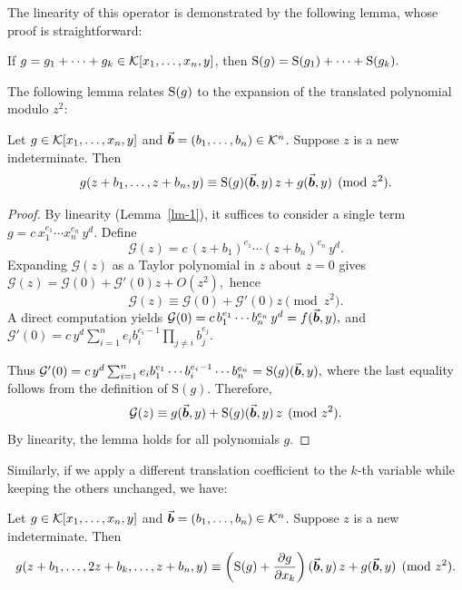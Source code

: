 \documentclass{article}
\numberwithin{equation}{section}
\begin{document}
The linearity of this operator is demonstrated by the following lemma, whose proof is straightforward:

\begin{lemma}\label{lm-1}
If $g = g_1 + \cdots + g_k\in {\mathcal{K}}[x_1,\dots,x_n,y]$, then
\(
{\rm S}(g) = {\rm S}(g_1) + \cdots + {\rm S}(g_k).
\)
\end{lemma}

The following lemma relates ${\rm S}(g)$ to the expansion of the translated polynomial modulo $z^2$:

\begin{lemma}\label{lm-4}
Let $g\in {\mathcal{K}}[x_1,\dots,x_n,y]$ and $\vec{\boldsymbol{b}}=(b_1,\dots,b_n)\in {\mathcal{K}}^{n}$. Suppose $z$ is a new indeterminate. Then
\[
g(z+b_1,\dots,z+b_n,y) \equiv \mathrm{S}(g)(\vec{\boldsymbol{b}},y)\, z + g(\vec{\boldsymbol{b}},y) \pmod{z^2}.\]
\end{lemma}
%
\begin{proof}
By linearity (Lemma~\ref{lm-1}), it suffices to consider a single term $g=c\,x_1^{e_1}\cdots x_n^{e_n}\,y^d$. Define
\[
\mathcal{G}(z)=c\,(z+b_1)^{e_1}\cdots (z+b_n)^{e_n}\,y^d.
\]
Expanding $\mathcal{G}(z)$ as a Taylor polynomial in $z$ about $z=0$ gives
%
$\mathcal{G}(z)=\mathcal{G}(0)+\mathcal{G}'(0)z+O(z^2),$
%
hence
\[
\mathcal{G}(z)\equiv \mathcal{G}(0)+\mathcal{G}'(0)z \pmod{z^2}.
\]
A direct computation yields
%
$\mathcal{G}(0)=c\,b_1^{e_1}\cdots b_n^{e_n}\,y^d=f(\vec{\boldsymbol{b}},y),
$
and
%
$\mathcal{G}'(0)=c\,y^d\sum_{i=1}^n e_i b_i^{e_i-1}\prod_{j\ne i} b_j^{e_j}.$

Thus
%
$\mathcal{G}'(0)=c\,y^d\sum_{i=1}^n e_i b_1^{e_1}\cdots b_i^{e_i-1}\cdots b_n^{e_n}
= \mathrm S(g)(\vec{\boldsymbol{b}},y),$
%
where the last equality follows from the definition of $\mathrm S(g)$. Therefore,
\[
\mathcal{G}(z)\equiv g(\vec{\boldsymbol{b}},y)+\mathrm S(g)(\vec{\boldsymbol{b}},y)\,z \pmod{z^2}.
\]
By linearity, the lemma holds for all polynomials $g$.
\end{proof}






Similarly, if we apply a different translation coefficient to the $k$-th variable while keeping the others unchanged, we have:

\begin{lemma}\label{2shift}
Let $g\in {\mathcal{K}}[x_1,\dots,x_n,y]$ and $\vec{\boldsymbol{b}}=(b_1,\dots,b_n)\in {\mathcal{K}}^{n}$. Suppose $z$ is a new indeterminate. Then
\[
g(z+b_1,\dots,2z+b_k,\dots,z+b_n,y) \equiv 
\left(\mathrm S(g)+\frac{\partial g}{\partial x_k}\right)(\vec{\boldsymbol{b}},y)\, z + g(\vec{\boldsymbol{b}},y) \pmod{z^2}.
\]
\end{lemma}
\end{document}

